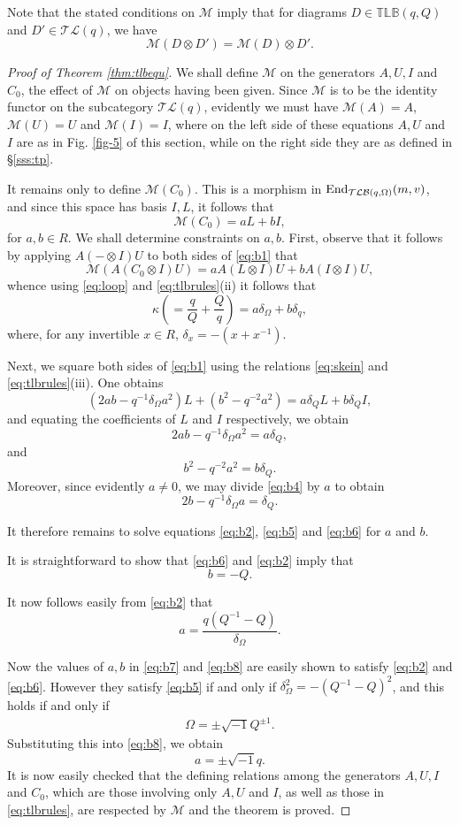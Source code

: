 \documentclass[12pt]{amsart}
\theoremstyle{definition}
\theoremstyle{remark}
\numberwithin{equation}{section}
\newcommand{\CM}{{\mathcal M}}
\newcommand{\be}{\begin{equation}}
\newcommand{\ee}{\end{equation}}
\newcommand{\inv}{^{-1}}
\newcommand{\is}{\sqrt{-1}}
\newcommand{\End}{{\rm{End}}}
\newcommand{\ot}{\otimes}
\newcommand{\TLC}{\mathcal{TL}}
\newcommand{\TLBB}{{\mathbb{TLB}}}
\newcommand{\TLBC}{\mathcal{TLB}}
\begin{document}
Note that the stated conditions on $\CM$ imply that for diagrams
$D\in\TLBB(q,Q)$ and $D'\in\TLC(q)$, we have
\be\label{eq:resp}
\CM(D\ot D')=\CM(D)\ot D'.
\ee

\begin{proof}[Proof of Theorem \ref{thm:tlbequ}]
We shall define $\CM$ on the generators $A,U,I$ and $C_0$, the effect of $\CM$ on objects having been given.
Since $\CM$ is to be the identity functor on the subcategory $\TLC(q)$, evidently we must have $\CM(A)=A$,
$\CM(U)=U$ and $\CM(I)=I$, where on the left side of these equations $A,U$ and $I$ are as in Fig. \ref{fig-5} of this section,
while on the right side they are as defined in \S\ref{sss:tp}.

It remains only to define $\CM(C_0)$. This is a morphism in $\End_{\TLBC(q,\Omega)}(m,v)$, and since this space 
has basis $I,L$, it follows that
\be\label{eq:b1}
\CM(C_0)=aL+bI,
\ee
for $a,b\in R$. We shall determine constraints on $a,b$. First, observe that it follows
by applying $A(-\ot I)U$ to both sides of \eqref{eq:b1} that
\[
\CM(A(C_0\ot I)U)=aA(L\ot I)U+bA(I\ot I)U,
\]
whence using \eqref{eq:loop} and \eqref{eq:tlbrules}(ii) it follows that
\be\label{eq:b2}
\kappa(= \frac{q}{Q}+\frac{Q}{q})=a\delta_\Omega+b\delta_q,
\ee
where, for any invertible $x\in R$, $\delta_x=-(x+x\inv)$.

Next, we square both sides of \eqref{eq:b1} using the relations \eqref{eq:skein} and \eqref{eq:tlbrules}(iii).
One obtains
\be\label{eq:b3}
(2ab-q\inv\delta_\Omega a^2)L+(b^2-q^{-2}a^2)=a\delta_Q L+b\delta_Q I,
\ee
and equating the coefficients of $L$ and $I$ respectively, we obtain
\be\label{eq:b4}
2ab-q\inv\delta_\Omega a^2=a\delta_Q,
\ee
and
\be\label{eq:b5}
b^2-q^{-2}a^2=b\delta_Q.
\ee
Moreover, since evidently $a\neq 0$, we may divide \eqref{eq:b4} by $a$ to obtain
\be\label{eq:b6}
2b-q^{-1}\delta_\Omega a=\delta_Q.
\ee

It therefore remains to solve equations \eqref{eq:b2}, \eqref{eq:b5} and \eqref{eq:b6} for $a$ and $b$.

It is straightforward to show that \eqref{eq:b6} and \eqref{eq:b2} imply that
\be\label{eq:b7}
b=-Q.
\ee

It now follows easily from \eqref{eq:b2} that
\be\label{eq:b8}
a=\frac{q(Q\inv-Q)}{\delta_\Omega}.
\ee

Now the values of $a,b$ in \eqref{eq:b7} and \eqref{eq:b8} are easily shown to satisfy \eqref{eq:b2} and \eqref{eq:b6}.
However they satisfy \eqref{eq:b5} if and only if $\delta_\Omega^2=-(Q\inv-Q)^2$, and this holds if and only if
\begin{eqnarray}\label{eq:Omega-Q}
\Omega=\pm \is Q^{\pm 1}. 
\end{eqnarray}
Substituting this into \eqref{eq:b8}, we obtain 
\[
a=\pm\sqrt{-1} q.
\]
It is now easily checked that the defining relations among the generators $A,U,I$ and $C_0$, which are those involving only
$A,U$ and $I$, as well as those in \eqref{eq:tlbrules}, are respected by $\CM$ and the theorem is proved.
\end{proof}
\end{document}
